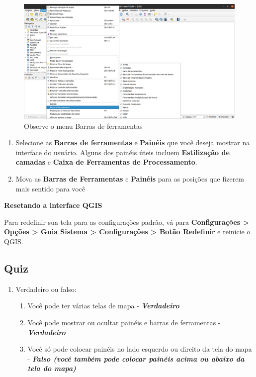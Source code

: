 \documentclass[
]{krantz}
\providecommand{\tightlist}{%
  \setlength{\itemsep}{0pt}\setlength{\parskip}{0pt}}
\begin{document}
\begin{figure}
\centering
\includegraphics{media/modulo1/ex01-03.png}
\caption{Observe o menu Barras de ferramentas}
\end{figure}

\begin{enumerate}
\def\labelenumi{\arabic{enumi}.}
\setcounter{enumi}{4}
\tightlist
\item
  Selecione as \textbf{Barras de ferramentas} e \textbf{Painéis} que você deseja mostrar na interface do usuário. Alguns dos painéis úteis incluem \textbf{Estilização de camadas} e \textbf{Caixa de Ferramentas de Processamento}.
\item
  Mova as \textbf{Barras de Ferramentas} e \textbf{Painéis} para as posições que fizerem mais sentido para você
\end{enumerate}

\textbf{Resetando a interface QGIS}

Para redefinir sua tela para as configurações padrão, vá para \textbf{Configurações \textgreater{} Opções \textgreater{} Guia Sistema \textgreater{} Configurações \textgreater{} Botão Redefinir} e reinicie o QGIS.

\hypertarget{quiz-3}{%
\subsection{Quiz}\label{quiz-3}}

\begin{enumerate}
\def\labelenumi{\arabic{enumi}.}
\tightlist
\item
  Verdadeiro ou falso:

  \begin{enumerate}
  \def\labelenumii{\arabic{enumii}.}
  \tightlist
  \item
    Você pode ter várias telas de mapa - \textbf{\emph{Verdadeiro}}
  \item
    Você pode mostrar ou ocultar painéis e barras de ferramentas - \textbf{\emph{Verdadeiro}}
  \item
    Você só pode colocar painéis no lado esquerdo ou direito da tela do mapa - \textbf{\emph{Falso (você também pode colocar painéis acima ou abaixo da tela do mapa)}}
  \end{enumerate}
\end{enumerate}
\end{document}
